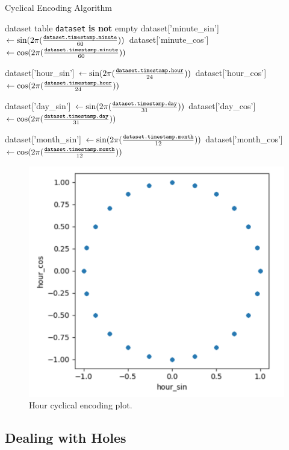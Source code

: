 \begin{algorithm}[H]
	\caption{Cyclical Encoding Algorithm}\label{alg:cyclicencoding}
	\begin{algorithmic}
		\Require dataset table
		\Ensure \texttt{dataset} \textbf{is not} empty
		\State dataset['minute\_sin'] $\gets \sin(2 \pi (\frac{\text{\texttt{dataset.timestamp.minute}}}{60}))$
		\State dataset['minute\_cos'] $\gets \cos(2 \pi (\frac{\text{\texttt{dataset.timestamp.minute}}}{60}))$


		\State dataset['hour\_sin'] $\gets \sin(2 \pi (\frac{\text{\texttt{dataset.timestamp.hour}}}{24}))$
		\State dataset['hour\_cos'] $\gets \cos(2 \pi (\frac{\text{\texttt{dataset.timestamp.hour}}}{24}))$


		\State dataset['day\_sin'] $\gets \sin(2 \pi (\frac{\text{\texttt{dataset.timestamp.day}}}{31}))$
		\State dataset['day\_cos'] $\gets \cos(2 \pi (\frac{\text{\texttt{dataset.timestamp.day}}}{31}))$

		\State dataset['month\_sin'] $\gets \sin(2 \pi (\frac{\text{\texttt{dataset.timestamp.month}}}{12}))$
		\State dataset['month\_cos'] $\gets \cos(2 \pi (\frac{\text{\texttt{dataset.timestamp.month}}}{12}))$
	\end{algorithmic}
\end{algorithm}

\begin{figure}[H]
	\centering
	\includegraphics[width=0.7\linewidth, keepaspectratio]{chapters/2_data_preprocessing/imgs/hoursincosplot.png}
	\caption{Hour cyclical encoding plot.}
	\label{fig:encodingplot}
\end{figure}

\subsection{Dealing with Holes}

